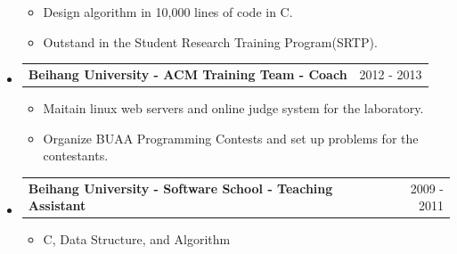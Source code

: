 \documentclass[a4paper,11pt]{article}
\makeatletter
\newcommand{\ressubheadingsingleline}[2]{
    \begin{tabular*}{6.5in}{l@{\extracolsep{\fill}}r}
        \textbf{#1} & #2 \\
    \end{tabular*}\vspace{-6pt}
}
\newcommand{\CC}{C\nolinebreak\hspace{-.05em}\raisebox{.4ex}{\tiny\bf +}\nolinebreak\hspace{-.10em}\raisebox{.4ex}{\tiny\bf +}}
\newcommand{\CS}{C\nolinebreak\hspace{-.05em}\raisebox{.6ex}{\scriptsize\bf{\#}}}
\makeatother
\begin{document}
\begin{itemize}
\begin{itemize}
			\item Design algorithm in 10,000 lines of code in \CS.
			\item Outstand in the Student Research Training Program(SRTP). 
		\end{itemize}
	\item \ressubheadingsingleline{Beihang University - ACM Training Team - Coach}
		{2012 - 2013}
		\begin{itemize}  \setlength{\itemsep}{0pt}
			\item Maitain {linux web servers} 
				and online judge system for the laboratory.
			\item Organize BUAA Programming Contests 
				and set up problems for the contestants.
		\end{itemize}
	\item \ressubheadingsingleline{Beihang University - Software School - Teaching Assistant}{2009 - 2011} 
		\begin{itemize}
			\item \CC{}, Data Structure, and Algorithm
		\end{itemize}
	\vspace{6pt}
\end{itemize}	
\end{document}
